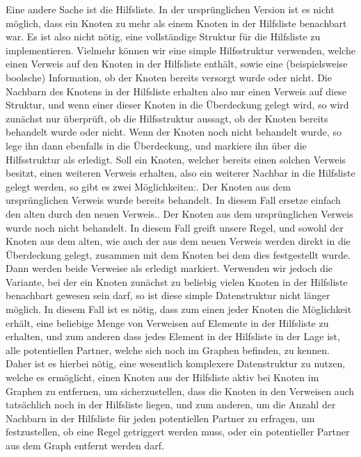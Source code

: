 \documentclass[12pt,onecolumn, notitlepage]{scrartcl}
\begin{document}
Eine andere Sache ist die Hilfsliste. In der ursprünglichen Version ist es nicht möglich, dass ein Knoten zu mehr als einem Knoten in der Hilfsliste benachbart war. Es ist also nicht nötig, eine vollständige Struktur für die Hilfsliste zu implementieren. Vielmehr können wir eine simple Hilfsstruktur verwenden, welche einen Verweis auf den Knoten in der Hilfsliste enthält, sowie eine (beispielsweise boolsche) Information, ob der Knoten bereits versorgt wurde oder nicht. Die Nachbarn des Knotens in der Hilfsliste erhalten also nur einen Verweis auf diese Struktur, und wenn einer dieser Knoten in die Überdeckung gelegt wird, so wird zunächst nur überprüft, ob die Hilfsstruktur aussagt, ob der Knoten bereits behandelt wurde oder nicht. Wenn der Knoten noch nicht behandelt wurde, so lege ihn dann ebenfalls in die Überdeckung, und markiere ihn über die Hilfsstruktur als erledigt. 
Soll ein Knoten, welcher bereits einen solchen Verweis besitzt, einen weiteren Verweis erhalten, also ein weiterer Nachbar in die Hilfsliste gelegt werden, so gibt es zwei Möglichkeiten:\newline {}. Der Knoten aus dem ursprünglichen Verweis wurde bereits behandelt. In diesem Fall ersetze einfach den alten durch den neuen Verweis.. Der Knoten aus dem ursprünglichen Verweis wurde noch nicht behandelt. In diesem Fall greift unsere Regel, und sowohl der Knoten aus dem alten, wie auch der aus dem neuen Verweis werden direkt in die Überdeckung gelegt, zusammen mit dem Knoten bei dem dies festgestellt wurde. Dann werden beide Verweise als erledigt markiert. \newline\newline
Verwenden wir jedoch die Variante, bei der ein Knoten zunächst zu beliebig vielen Knoten in der Hilfsliste benachbart gewesen sein darf, so ist diese simple Datenstruktur nicht länger möglich. In diesem Fall ist es nötig, dass zum einen jeder Knoten die Möglichkeit erhält, eine beliebige Menge von Verweisen auf Elemente in der Hilfsliste zu erhalten, und zum anderen dass jedes Element in der Hilfsliste in der Lage ist, alle potentiellen Partner, welche sich noch im Graphen befinden, zu kennen. Daher ist es hierbei nötig, eine wesentlich komplexere Datenstruktur zu nutzen, welche es ermöglicht, einen Knoten aus der Hilfsliste aktiv bei Knoten im Graphen zu entfernen, um sicherzustellen, dass die Knoten in den Verweisen auch tatsächlich noch in der Hilfsliste liegen, und zum anderen, um die Anzahl der Nachbarn in der Hilfsliste für jeden potentiellen Partner zu erfragen, um festzustellen, ob eine Regel getriggert werden muss, oder ein potentieller Partner aus dem Graph entfernt werden darf.\newline
\end{document}
